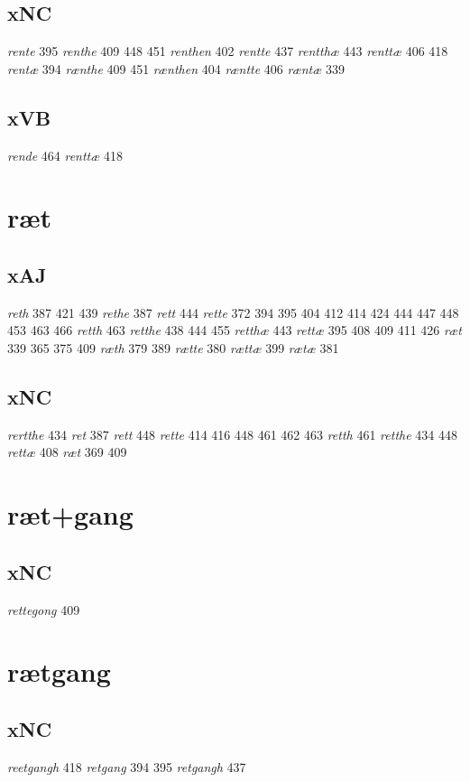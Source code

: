 \documentclass[a4paper,twocolumn]{article}
\begin{document}
\subsection{xNC}
\label{sec:orge41b019}
\emph{rente} 395 \emph{renthe} 409 448 451 \emph{renthen} 402 \emph{rentte} 437 \emph{rentthæ} 443 \emph{renttæ} 406 418 \emph{rentæ} 394 \emph{rænthe} 409 451 \emph{rænthen} 404 \emph{ræntte} 406 \emph{ræntæ} 339 
\subsection{xVB}
\label{sec:orgf55cc0c}
\emph{rende} 464 \emph{renttæ} 418 
\section{ræt}
\label{sec:org492bb61}
\subsection{xAJ}
\label{sec:orgc913a0c}
\emph{reth} 387 421 439 \emph{rethe} 387 \emph{rett} 444 \emph{rette} 372 394 395 404 412 414 424 444 447 448 453 463 466 \emph{retth} 463 \emph{retthe} 438 444 455 \emph{retthæ} 443 \emph{rettæ} 395 408 409 411 426 \emph{ræt} 339 365 375 409 \emph{ræth} 379 389 \emph{rætte} 380 \emph{rættæ} 399 \emph{rætæ} 381 
\subsection{xNC}
\label{sec:orge19d14a}
\emph{rertthe} 434 \emph{ret} 387 \emph{rett} 448 \emph{rette} 414 416 448 461 462 463 \emph{retth} 461 \emph{retthe} 434 448 \emph{rettæ} 408 \emph{ræt} 369 409 
\section{ræt+gang}
\label{sec:orga33542c}
\subsection{xNC}
\label{sec:org699586c}
\emph{rettegong} 409 
\section{rætgang}
\label{sec:org36c72c1}
\subsection{xNC}
\label{sec:org7ea3502}
\emph{reetgangh} 418 \emph{retgang} 394 395 \emph{retgangh} 437 
\end{document}
